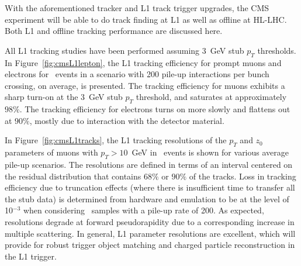 With the aforementioned tracker and L1 track trigger upgrades, the CMS experiment will be able to do track finding at L1 as well as offline at HL-LHC. Both L1 and offline tracking performance are discussed here.

All L1 tracking studies have been performed assuming 3~GeV stub $p_T$ thresholds. In Figure~\ref{fig:cmsL1lepton}, the L1 tracking efficiency for prompt muons and electrons for \ttbar~events in a scenario with 200 pile-up interactions per bunch crossing, on average, is presented. The tracking efficiency for muons exhibits a sharp turn-on at the 3~GeV stub $p_T$ threshold, and saturates at approximately $98\%$. The tracking efficiency for electrons turns on more slowly and flattens out at $90\%$, mostly due to interaction with the detector material.

In Figure~\ref{fig:cmsL1tracks}, the L1 tracking resolutions of the $p_T$ and $z_0$ parameters of muons with $p_T > 10$~GeV in \ttbar~events is shown for various average pile-up scenarios. The resolutions are defined in terms of an interval centered on the residual distribution that contains $68\%$ or $90\%$ of the tracks. Loss in tracking efficiency due to truncation effects (where there is insufficient time to transfer all the stub data) is determined from hardware and emulation to be at the level of 10$^{-3}$ when considering \ttbar~samples with a pile-up rate of 200. As expected, resolutions degrade at forward pseudorapidity due to a corresponding increase in multiple scattering. In general, L1 parameter resolutions are excellent, which will provide for robust trigger object matching and charged particle reconstruction in the L1 trigger.

